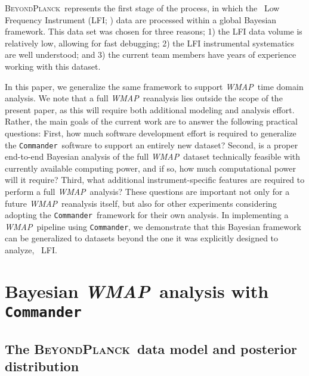 \documentclass[twocolumn]{aa}
\def\WMAP{\emph{WMAP}}
\def\commander{\texttt{Commander}}
\newcommand{\BP}{\textsc{BeyondPlanck}}
\begin{document}
\BP\ represents the first stage of the process, in which the \Planck\ Low
Frequency Instrument (LFI;
\citealp{planck2013-p03,planck2014-a03,planck2016-l02}) data are processed within a global Bayesian framework. This data set was chosen for three reasons; 1) the LFI data volume is relatively low, allowing
for fast debugging; 2) the LFI instrumental systematics are well understood;
and 3) the current team members have years of experience working with this
dataset.

In this paper, 
we generalize the same framework to support \WMAP\ time domain analysis. We note that a full \WMAP\ reanalysis lies outside
the scope of the present paper, as this will require both additional modeling
and analysis effort. Rather, the main goals of the current work are to answer
the following practical questions: First, how much software development effort
is required to generalize the \commander\ software to support an entirely new
dataset? Second, is a proper end-to-end Bayesian analysis of the full \WMAP\
dataset technically feasible with currently available computing power, and if
so, how much computational power will it require? Third, what additional
instrument-specific features are required to perform a full \WMAP\ analysis?
These questions are important not only for a future \WMAP\ reanalysis itself,
but also for other experiments considering adopting the \commander\ framework for
their own analysis. In implementing a \WMAP\ pipeline using \commander, we
demonstrate that this Bayesian framework can be generalized to datasets beyond the one it was
explicitly designed to analyze, \Planck\ LFI. 

\section{Bayesian \WMAP\ analysis with \commander}
\label{sec:bp}


\subsection{The \BP\ data model and posterior distribution}
\end{document}
